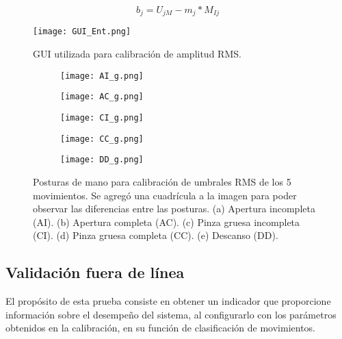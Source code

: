 \vfill
\begin{equation}
	b_{j} = U_{jM} - m_{j}*M_{Ij}
	\label{Ecu: b}
\end{equation}

\vfill
\begin{figure}[htb]
	\centering
	\texttt{[image: GUI\_Ent.png]}
	\caption{GUI utilizada para calibración de amplitud RMS.}
	\label{Figura: GUI_Ent}
\end{figure}

\begin{figure}[htbp]
	\centering
	\begin{subfigure}[htbp]{0.4\textwidth}
		\texttt{[image: AI\_g.png]}
		\caption{}
		\label{Figura: AI}
	\end{subfigure}
	\begin{subfigure}[htbp]{0.4\textwidth}
		\texttt{[image: AC\_g.png]}
		\caption{}
		\label{Figura: AC}
	\end{subfigure}
	\newline
	\begin{subfigure}[htbp]{0.4\textwidth}
		\texttt{[image: CI\_g.png]}
		\caption{}
		\label{Figura: CI}
	\end{subfigure}
	\begin{subfigure}[htbp]{0.4\textwidth}
		\texttt{[image: CC\_g.png]}
		\caption{}
		\label{Figura: CC}
	\end{subfigure}
	\newline
	\begin{subfigure}[htbp]{0.4\textwidth}
		\texttt{[image: DD\_g.png]}
		\caption{}
		\label{Figura: DD}
	\end{subfigure}
	\caption[Posturas de mano para calibración de umbrales RMS]{Posturas de mano para calibración de umbrales RMS de los 5 movimientos. Se agregó una cuadrícula a la imagen para poder observar las diferencias entre las posturas. (a) Apertura incompleta (AI). (b) Apertura completa (AC). (c) Pinza gruesa incompleta (CI). (d) Pinza gruesa completa (CC). (e) Descanso (DD).}
	\label{Figura: Posturas}
\end{figure}

\newpage
\subsection{Validación fuera de línea}
El propósito de esta prueba consiste en obtener un indicador que proporcione información sobre el desempeño del sistema, al configurarlo con los parámetros obtenidos en la calibración, en su función de clasificación de movimientos.

